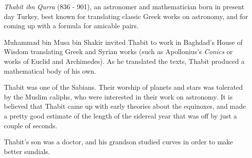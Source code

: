 \documentclass[12pt]{article}
\begin{document}
{\em Thabit ibn Qurra} (836 - 901), an astronomer and mathematician born in present day Turkey, best known for translating classic Greek works on astronomy, and for coming up with a formula for amicable pairs.

Muhammad bin Musa bin Shakir invited Thabit to work in Baghdad's House of Wisdom translating Greek and Syrian works (such as Apollonius's {\it Conics} or works of Euclid and Archimedes). As he translated the texts, Thabit produced a mathematical body of his own.

Thabit was one of the Sabians. Their worship of planets and stars was tolerated by the Muslim caliphs, who were interested in their work on astronomy. It is believed that Thabit came up with early theories about the equinoxes, and made a pretty good estimate of the length of the sidereal year that was off by just a couple of seconds.

Thabit's son was a doctor, and his grandson studied curves in order to make better sundials.
\end{document}
